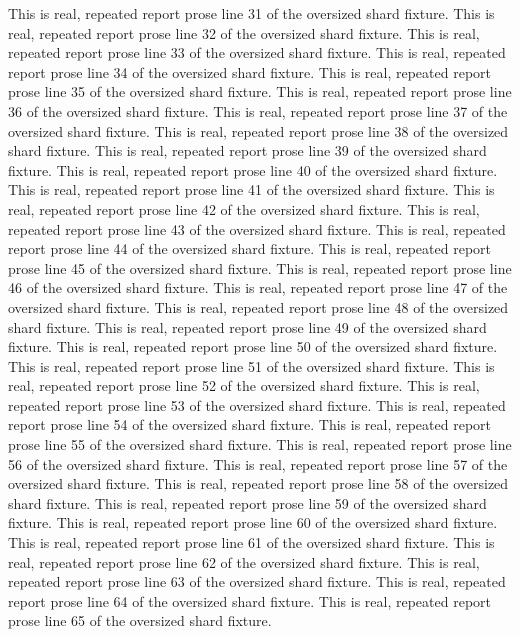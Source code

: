 This is real, repeated report prose line 31 of the oversized shard fixture.
This is real, repeated report prose line 32 of the oversized shard fixture.
This is real, repeated report prose line 33 of the oversized shard fixture.
This is real, repeated report prose line 34 of the oversized shard fixture.
This is real, repeated report prose line 35 of the oversized shard fixture.
This is real, repeated report prose line 36 of the oversized shard fixture.
This is real, repeated report prose line 37 of the oversized shard fixture.
This is real, repeated report prose line 38 of the oversized shard fixture.
This is real, repeated report prose line 39 of the oversized shard fixture.
This is real, repeated report prose line 40 of the oversized shard fixture.
This is real, repeated report prose line 41 of the oversized shard fixture.
This is real, repeated report prose line 42 of the oversized shard fixture.
This is real, repeated report prose line 43 of the oversized shard fixture.
This is real, repeated report prose line 44 of the oversized shard fixture.
This is real, repeated report prose line 45 of the oversized shard fixture.
This is real, repeated report prose line 46 of the oversized shard fixture.
This is real, repeated report prose line 47 of the oversized shard fixture.
This is real, repeated report prose line 48 of the oversized shard fixture.
This is real, repeated report prose line 49 of the oversized shard fixture.
This is real, repeated report prose line 50 of the oversized shard fixture.
This is real, repeated report prose line 51 of the oversized shard fixture.
This is real, repeated report prose line 52 of the oversized shard fixture.
This is real, repeated report prose line 53 of the oversized shard fixture.
This is real, repeated report prose line 54 of the oversized shard fixture.
This is real, repeated report prose line 55 of the oversized shard fixture.
This is real, repeated report prose line 56 of the oversized shard fixture.
This is real, repeated report prose line 57 of the oversized shard fixture.
This is real, repeated report prose line 58 of the oversized shard fixture.
This is real, repeated report prose line 59 of the oversized shard fixture.
This is real, repeated report prose line 60 of the oversized shard fixture.
This is real, repeated report prose line 61 of the oversized shard fixture.
This is real, repeated report prose line 62 of the oversized shard fixture.
This is real, repeated report prose line 63 of the oversized shard fixture.
This is real, repeated report prose line 64 of the oversized shard fixture.
This is real, repeated report prose line 65 of the oversized shard fixture.
